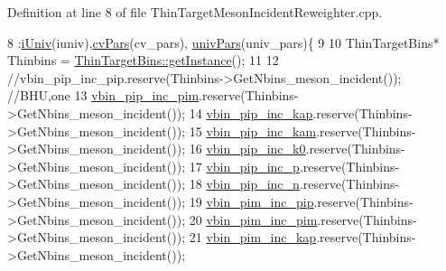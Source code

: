 Definition at line 8 of file Thin\-Target\-Meson\-Incident\-Reweighter.\-cpp.


\begin{DoxyCode}
8                                                                                                            
                                          :\hyperlink{class_neutrino_flux_reweight_1_1_thin_target_meson_incident_reweighter_aba895e921936f33c25a89daa18c1bf5d}{iUniv}(iuniv),\hyperlink{class_neutrino_flux_reweight_1_1_thin_target_meson_incident_reweighter_a1e7d2570076d7f35a84edfd053ef7b54}{cvPars}(cv\_pars),
      \hyperlink{class_neutrino_flux_reweight_1_1_thin_target_meson_incident_reweighter_a04e7825e0d90c6a0315028620f2ac511}{univPars}(univ\_pars)\{
9     
10     ThinTargetBins* Thinbins =  \hyperlink{class_neutrino_flux_reweight_1_1_thin_target_bins_aeff5cf7220dd08322f5abac2cbc7ff33}{ThinTargetBins::getInstance}();
11     
12     \textcolor{comment}{//vbin\_pip\_inc\_pip.reserve(Thinbins->GetNbins\_meson\_incident());  //BHU,one}
13     \hyperlink{class_neutrino_flux_reweight_1_1_thin_target_meson_incident_reweighter_aaf511004916c8cde16914f776bd24567}{vbin\_pip\_inc\_pim}.reserve(Thinbins->GetNbins\_meson\_incident());
14     \hyperlink{class_neutrino_flux_reweight_1_1_thin_target_meson_incident_reweighter_a313579b46a30eab2e8181bdbb616400b}{vbin\_pip\_inc\_kap}.reserve(Thinbins->GetNbins\_meson\_incident());
15     \hyperlink{class_neutrino_flux_reweight_1_1_thin_target_meson_incident_reweighter_a4b9a6dea5fa9006465b9869f7f5a7ef4}{vbin\_pip\_inc\_kam}.reserve(Thinbins->GetNbins\_meson\_incident());
16     \hyperlink{class_neutrino_flux_reweight_1_1_thin_target_meson_incident_reweighter_a4dc56ba2cd4aefe825f48334dc9fd570}{vbin\_pip\_inc\_k0}.reserve(Thinbins->GetNbins\_meson\_incident());
17     \hyperlink{class_neutrino_flux_reweight_1_1_thin_target_meson_incident_reweighter_a094b50773eedca4a30e58067d55b61c7}{vbin\_pip\_inc\_p}.reserve(Thinbins->GetNbins\_meson\_incident());
18     \hyperlink{class_neutrino_flux_reweight_1_1_thin_target_meson_incident_reweighter_a709b2752b6bf405c479a985a136a8c5e}{vbin\_pip\_inc\_n}.reserve(Thinbins->GetNbins\_meson\_incident());
19     \hyperlink{class_neutrino_flux_reweight_1_1_thin_target_meson_incident_reweighter_a91fcf6a2aae6942bca236752fa38af15}{vbin\_pim\_inc\_pip}.reserve(Thinbins->GetNbins\_meson\_incident());
20     \hyperlink{class_neutrino_flux_reweight_1_1_thin_target_meson_incident_reweighter_ad9fb46f9b120a879ab057578902ba63e}{vbin\_pim\_inc\_pim}.reserve(Thinbins->GetNbins\_meson\_incident());
21     \hyperlink{class_neutrino_flux_reweight_1_1_thin_target_meson_incident_reweighter_adb7bd7bf69b005ef32845bf80d0dcff3}{vbin\_pim\_inc\_kap}.reserve(Thinbins->GetNbins\_meson\_incident());

\end{DoxyCode}
